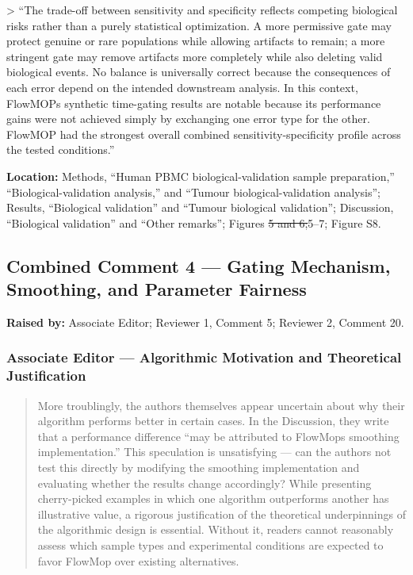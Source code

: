 \documentclass[
  11pt,
  a4paper,
]{article}
\begin{document}
{\color{revisionblue}\textgreater{} ``The trade-off between sensitivity
and specificity reflects competing biological risks rather than a purely
statistical optimization. A more permissive gate may protect genuine or
rare populations while allowing artifacts to remain; a more stringent
gate may remove artifacts more completely while also deleting valid
biological events. No balance is universally correct because the
consequences of each error depend on the intended downstream analysis.
In this context, FlowMOP\textquotesingle s synthetic time-gating results
are notable because its performance gains were not achieved simply by
exchanging one error type for the other. FlowMOP had the strongest
overall combined sensitivity-specificity profile across the tested
conditions.''}

\textbf{Location:} Methods, {\color{revisionblue}``Human PBMC
biological-validation sample preparation,'' ``Biological-validation
analysis,'' and} ``Tumour biological-validation analysis''; Results,
{\color{revisionblue}``Biological validation'' and} ``Tumour biological
validation''; Discussion, ``Biological validation'' and ``Other
remarks''; Figures {\color{revisionred}\sout{5 and
6;}}{\color{revisionblue}5--7;} Figure S8.

\subsection{Combined Comment 4 --- Gating Mechanism, Smoothing, and
Parameter
Fairness}\label{combined-comment-4--gating-mechanism-smoothing-and-parameter-fairness}

\textbf{Raised by:} Associate Editor; Reviewer 1, Comment 5; Reviewer 2,
Comment 20.

\subsubsection{Associate Editor --- Algorithmic Motivation and
Theoretical
Justification}\label{associate-editor--algorithmic-motivation-and-theoretical-justification-1}

\begin{quote}
More troublingly, the authors themselves appear uncertain about why
their algorithm performs better in certain cases. In the Discussion,
they write that a performance difference ``may be attributed to
FlowMop\textquotesingle s \textquotesingle smoothing\textquotesingle{}
implementation.'' This speculation is unsatisfying --- can the authors
not test this directly by modifying the smoothing implementation and
evaluating whether the results change accordingly? While presenting
cherry-picked examples in which one algorithm outperforms another has
illustrative value, a rigorous justification of the theoretical
underpinnings of the algorithmic design is essential. Without it,
readers cannot reasonably assess which sample types and experimental
conditions are expected to favor FlowMop over existing alternatives.
\end{quote}
\end{document}
